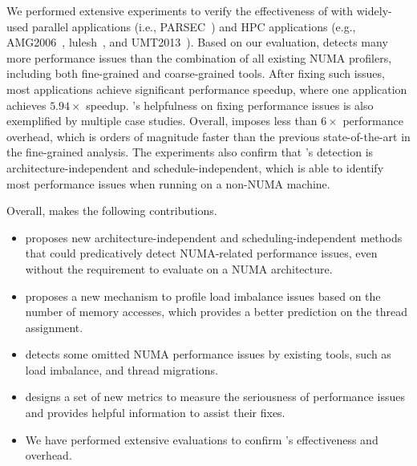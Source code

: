 We performed extensive experiments to verify the effectiveness of \NP{} with widely-used parallel applications (i.e., PARSEC~\cite{parsec}) and HPC applications (e.g., AMG2006~\cite{AMG2006}, lulesh~\cite{LULESH}, and UMT2013~\cite{UMT2013}). Based on our evaluation, \NP{} detects many more performance issues than the combination of all existing NUMA profilers, including both fine-grained and coarse-grained tools. After fixing such issues, most applications achieve significant performance speedup, where one application  achieves $5.94\times$ speedup.  \NP{}'s helpfulness on fixing performance issues is also exemplified by multiple case studies. Overall, \NP{} imposes less than $6\times$ performance overhead, which is orders of magnitude faster than the previous state-of-the-art in the fine-grained analysis. The experiments also confirm that \NP{}'s detection is architecture-independent and schedule-independent, which is able to identify most performance issues when running on a non-NUMA machine. 

Overall, \NP{} makes the following contributions. 

\begin{itemize}
    \item \NP{} proposes new architecture-independent and scheduling-independent methods that could predicatively detect NUMA-related performance issues, even without the requirement to evaluate on a NUMA architecture. 
    
    \item  \NP{} proposes a new mechanism to profile load imbalance issues based on the number of memory accesses, which provides a better prediction on the thread assignment.  
    
    \item \NP{} detects some omitted NUMA performance issues by existing tools, such as load imbalance, and thread migrations. 
    
    \item \NP{} designs a set of new metrics to measure the seriousness of performance issues and provides helpful information to assist their fixes.
    
     \item We have performed extensive evaluations to confirm \NP{}'s effectiveness and overhead.  
    
\end{itemize}


